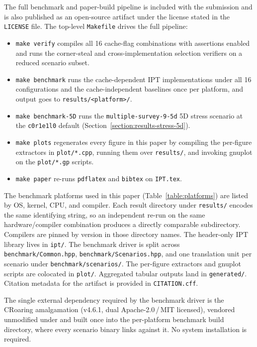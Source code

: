 \documentclass[manuscript,screen,review]{acmart}
\theoremstyle{definition}
\theoremstyle{plain}
\begin{document}
The full benchmark and paper-build pipeline is included with the
submission and is also published as an open-source artifact under the
license stated in the \texttt{LICENSE} file. The top-level
\texttt{Makefile} drives the full pipeline:
\begin{itemize}
  \item \texttt{make verify} compiles all 16 cache-flag combinations
    with assertions enabled and runs the corner-steal and
    cross-implementation selection verifiers on a reduced scenario
    subset.
  \item \texttt{make benchmark} runs the cache-dependent IPT
    implementations under all 16 configurations and the
    cache-independent baselines once per platform, and output goes to
    \texttt{results/<platform>/}.
  \item \texttt{make benchmark-5D} runs the
    \texttt{multiple-survey-9-5d} 5D stress scenario at the
    \texttt{c0r1e1l0} default
    (Section~\ref{section:results-stress-5d}).
  \item \texttt{make plots} regenerates every figure in this paper
    by compiling the per-figure extractors in \texttt{plot/*.cpp}, running
    them over \texttt{results/}, and invoking gnuplot on the
    \texttt{plot/*.gp} scripts.
  \item \texttt{make paper} re-runs \texttt{pdflatex} and
    \texttt{bibtex} on \texttt{IPT.tex}.
\end{itemize}

The benchmark platforms used in this paper
(Table~\ref{table:platforms}) are listed by OS, kernel, CPU, and
compiler. Each result directory under \texttt{results/} encodes the
same identifying string, so an independent re-run on the same
hardware/compiler combination produces a directly comparable
subdirectory. Compilers are pinned by version in those directory
names. The header-only IPT library lives in
\texttt{ipt/}. The benchmark driver is split across
\texttt{benchmark/Common.hpp}, \texttt{benchmark/Scenarios.hpp}, and
one translation unit per scenario under
\texttt{benchmark/scenarios/}. The per-figure extractors and gnuplot
scripts are colocated in \texttt{plot/}. Aggregated tabular outputs
land in \texttt{generated/}. Citation metadata for the artifact is
provided in \texttt{CITATION.cff}.

The single external dependency
required by the benchmark driver is the CRoaring amalgamation
(v4.6.1, dual Apache-2.0\,/\,MIT licensed), vendored unmodified under
 and built once into the per-platform
benchmark build directory, where every scenario binary links against
it. No system installation is required.
\end{document}
